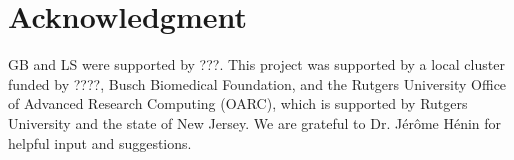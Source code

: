 \documentclass[9pt]{article}
\begin{document}
\section{Acknowledgment}

GB and LS were supported by ???. This project was supported by a local cluster funded by ????, Busch Biomedical Foundation, and the Rutgers University Office of Advanced Research Computing (OARC), which is supported by Rutgers University and the state of New Jersey. We are grateful to Dr. J{\'{e}}r{\^{o}}me H{\'{e}}nin for helpful input and suggestions.
\end{document}
